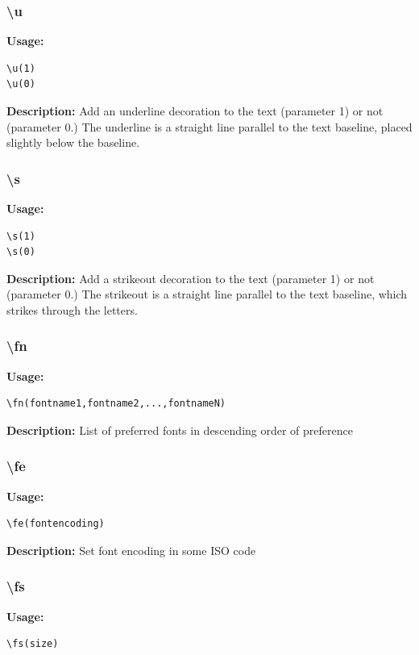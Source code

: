 \documentclass{spec}
\begin{document}
\subsubsection{\textbackslash u}
\textbf{Usage:}
\begin{verbatim}
\u(1)
\u(0)
\end{verbatim}

\textbf{Description:}
Add an underline decoration to the text (parameter 1) or not (parameter 0.) The underline is a straight
line parallel to the text baseline, placed slightly below the baseline.

\subsubsection{\textbackslash s}
\textbf{Usage:}
\begin{verbatim}
\s(1)
\s(0)
\end{verbatim}

\textbf{Description:}
Add a strikeout decoration to the text (parameter 1) or not (parameter 0.) The strikeout is a straight
line parallel to the text baseline, which strikes through the letters.

\subsubsection{\textbackslash fn}
\textbf{Usage:}
\begin{verbatim}
\fn(fontname1,fontname2,...,fontnameN)
\end{verbatim}

\textbf{Description:}
List of preferred fonts in descending order of preference


\subsubsection{\textbackslash fe}
\textbf{Usage:}
\begin{verbatim}
\fe(fontencoding)
\end{verbatim}

\textbf{Description:}
Set font encoding in some ISO code


\subsubsection{\textbackslash fs}
\textbf{Usage:}
\begin{verbatim}
\fs(size)
\end{verbatim}
\end{document}
